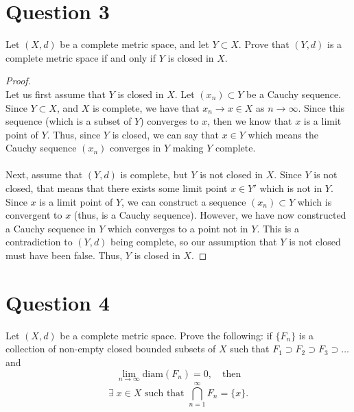 \documentclass[10pt,a4paper]{article}
\theoremstyle{definition}
\theoremstyle{definition}
\begin{document}
\section*{Question 3}
Let $(X, d)$ be a complete metric space, and let $Y \subset X$. Prove that $(Y, d)$ is a complete metric space if and only if $Y$ is closed in $X$. 

\begin{proof}$ $
\\Let us first assume that $Y$ is closed in $X$. Let $(x_n) \subset Y$ be a Cauchy sequence. Since $Y \subset X$, and $X$ is complete, we have that $x_n \to x \in X$ as $n \to \infty$. Since this sequence (which is a subset of $Y$) converges to $x$, then we know that $x$ is a limit point of $Y$. Thus, since $Y$ is closed, we can say that $x \in Y$ which means the Cauchy sequence $(x_n)$ converges in $Y$ making $Y$ complete. 
\\
\\Next, assume that $(Y, d)$ is complete, but $Y$ is not closed in $X$. Since $Y$ is not closed, that means that there exists some limit point $x \in Y'$ which is not in $Y$. Since $x$ is a limit point of $Y$, we can construct a sequence $(x_n) \subset Y$ which is convergent to $x$ (thus, is a Cauchy sequence). However, we have now constructed a Cauchy sequence in $Y$ which converges to a point not in $Y$. This is a contradiction to $(Y, d)$ being complete, so our assumption that $Y$ is not closed must have been false. Thus, $Y$ is closed in $X$. 
\end{proof}

\section*{Question 4}
Let $(X,d)$ be a complete metric space. Prove the following: if $\{F_n\}$ is a collection of non-empty closed bounded subsets of $X$ such that $F_1 \supset F_2 \supset F_3 \supset \ldots$ and $$\lim_{n \to \infty} \text{diam}(F_n) = 0, \quad \text{then}$$ $$ \exists \; x \in X \text{ such that } \bigcap_{n = 1}^\infty F_n = \{x\}.$$
\end{document}
